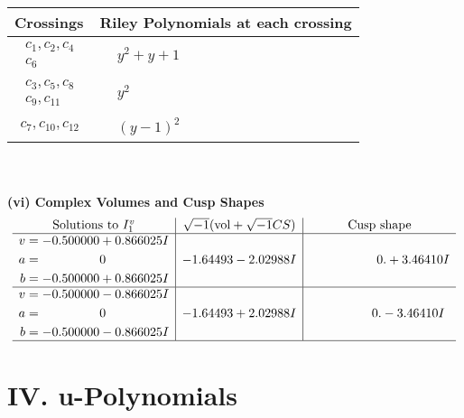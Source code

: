 \documentclass[1p]{elsarticle_modified}
\theoremstyle{definition}
\newcommand{\I}{\sqrt{-1}}
\begin{document}
\begin{tabular}{m{50pt}|m{274pt}}
Crossings & \hspace{64pt}Riley Polynomials at each crossing \\
\hline $$\begin{aligned}c_{1},c_{2},c_{4}\\c_{6}\end{aligned}$$&$\begin{aligned}
&y^2+y+1
\end{aligned}$\\
\hline $$\begin{aligned}c_{3},c_{5},c_{8}\\c_{9},c_{11}\end{aligned}$$&$\begin{aligned}
&y^2
\end{aligned}$\\
\hline $$\begin{aligned}c_{7},c_{10},c_{12}\end{aligned}$$&$\begin{aligned}
&(y-1)^2
\end{aligned}$\\
\hline
\end{tabular}\\~\\
\newpage\flushleft \textbf{(vi) Complex Volumes and Cusp Shapes}
$$\begin{array}{c|c|c}  
\text{Solutions to }I^v_{1}& \I (\text{vol} + \sqrt{-1}CS) & \text{Cusp shape}\\
 \hline 
\begin{aligned}
v &= -0.500000 + 0.866025 I \\
a &= \phantom{-0.000000 } 0 \\
b &= -0.500000 + 0.866025 I\end{aligned}
 & -1.64493 - 2.02988 I & \phantom{-0.000000 -}0. + 3.46410 I \\ \hline\begin{aligned}
v &= -0.500000 - 0.866025 I \\
a &= \phantom{-0.000000 } 0 \\
b &= -0.500000 - 0.866025 I\end{aligned}
 & -1.64493 + 2.02988 I & \phantom{-0.000000 } 0. - 3.46410 I\\
 \hline 
 \end{array}$$\newpage
\newpage\renewcommand{\arraystretch}{1}
\centering \section*{ IV. u-Polynomials}
\end{document}
